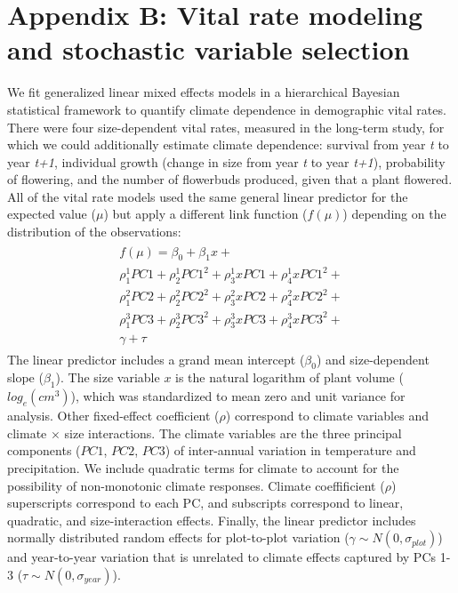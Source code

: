 \documentclass[12pt]{article}\usepackage[]{graphicx}\usepackage[]{color}
\begin{document}
\newpage
\section*{Appendix B: Vital rate modeling and stochastic variable selection}

We fit generalized linear mixed effects models in a hierarchical Bayesian statistical framework to quantify climate dependence in demographic vital rates. 
There were four size-dependent vital rates, measured in the long-term study, for which we could additionally estimate climate dependence: survival from year \textit{t} to year \textit{t+1}, individual growth (change in size from year \textit{t} to year \textit{t+1}), probability of flowering, and the number of flowerbuds produced, given that a plant flowered. 
All of the vital rate models used the same general linear predictor for the expected value ($\mu$) but apply a different link function ($f(\mu)$) depending on the distribution of the observations:
\begin{align}\label{eq:VR_lin_pred}
\begin{split} 
f(\mu) = \beta_{0} + \beta_{1}x + \\ 
\rho^{1}_{1}PC1 + \rho^{1}_{2}PC1^{2} + \rho^{1}_{3}xPC1 + \rho^{1}_{4}xPC1^{2} + \\
\rho^{2}_{1}PC2 + \rho^{2}_{2}PC2^{2} + \rho^{2}_{3}xPC2 + \rho^{2}_{4}xPC2^{2} + \\
\rho^{3}_{1}PC3 + \rho^{3}_{2}PC3^{2} + \rho^{3}_{3}xPC3 + \rho^{3}_{4}xPC3^{2} + \\
\gamma + \tau
\end{split}
\end{align}
The linear predictor includes a grand mean intercept ($\beta_{0}$) and size-dependent slope ($\beta_{1}$). The size variable $x$ is the natural logarithm of plant volume ($log_{e}(cm^{3})$), which was standardized to mean zero and unit variance for analysis. Other fixed-effect coefficient ($\rho$) correspond to climate variables and climate $\times$ size interactions. The climate variables are the three principal components ($PC1$, $PC2$, $PC3$) of inter-annual variation in temperature and precipitation. We include quadratic terms for climate to account for the possibility of non-monotonic climate responses. Climate coeffificient ($\rho$) superscripts correspond to each PC, and subscripts correspond to linear, quadratic, and size-interaction effects. Finally, the linear predictor includes normally distributed random effects for plot-to-plot variation ($\gamma \sim N(0,\sigma_{plot})$) and year-to-year variation that is unrelated to climate effects captured by PCs 1-3 ($\tau \sim N(0,\sigma_{year})$).
\end{document}
